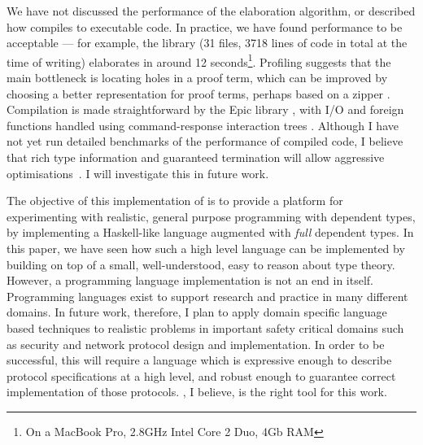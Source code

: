 We have not discussed the performance of the elaboration
algorithm, or described how \Idris{} compiles to executable code. In practice,
we have found performance to be acceptable --- for example, the \Idris{}
library (31 files, 3718 lines of code in total at the time of writing)
elaborates in around 12 seconds\footnote{On a MacBook Pro, 2.8GHz Intel Core 2
Duo, 4Gb RAM}. Profiling suggests that the main bottleneck is locating holes
in a proof term, which can be improved by choosing a better representation
for proof terms, perhaps based on a zipper \cite{Huet1997}. Compilation is made
straightforward by the Epic library \cite{brady2011epic}, with I/O and foreign
functions handled using command-response interaction trees \cite{Hancock2000}.
Although I have not yet run detailed benchmarks of the performance of compiled
code, I believe that rich type information and guaranteed termination will
allow aggressive optimisations~\cite{Brady2003,Brady2005}. I will investigate
this in future work.

The objective of this implementation of \Idris{} is to provide a platform
for experimenting with realistic, general purpose programming with dependent
types, by implementing a Haskell-like language augmented with \emph{full}
dependent types. 
In this paper, we have seen how such a high level language can be implemented
by building on top of a small, well-understood, easy to reason about type
theory. 
However, a programming language implementation is not an end in itself. 
Programming languages exist to support research and practice in many different
domains. In future work, therefore, I plan to apply domain specific
language based techniques to realistic problems in important safety critical
domains such as security and network protocol design and implementation. In
order to be successful, this will require a language which is expressive enough
to describe protocol specifications at a high level, and robust enough to
guarantee correct implementation of those protocols. \Idris{}, I believe, is
the right tool for this work.

